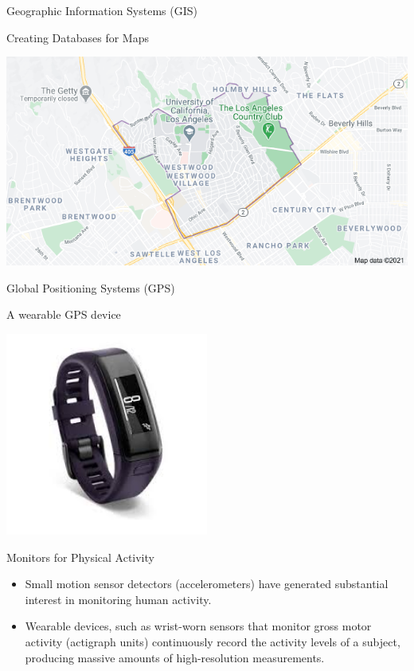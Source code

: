 \documentclass[
10pt]{beamer}
\begin{document}
\begin{frame}{Geographic Information Systems (GIS)}
 
 \begin{center}
  Creating Databases for Maps
  
  \medskip
  
  \includegraphics[scale=0.45]{figs/Westwood_GIS_Map.png}
 \end{center}
 
\end{frame}


\begin{frame}{Global Positioning Systems (GPS)}
 
\begin{center}
 A wearable GPS device 
 
 \medskip

 \includegraphics[width=0.5\textwidth]{figs/WearableGPS.jpg}
\end{center}
 
\end{frame}

\begin{frame}{Monitors for Physical Activity}
 
 \begin{itemize}\setlength{\itemsep}{0.4cm}
  \item Small motion sensor detectors (accelerometers) have generated substantial interest in monitoring human activity.
  
  \item Wearable devices, such as wrist-worn sensors that monitor gross motor activity (actigraph units) continuously record the activity levels of a subject, producing massive amounts of high-resolution measurements.
 \end{itemize}
 
\end{frame}
\end{document}
